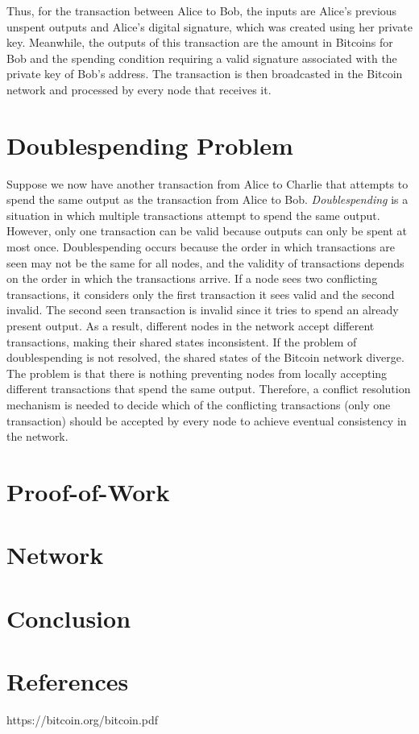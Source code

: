 \documentclass{article}
\begin{document}
Thus, for the transaction between Alice to Bob, the inputs are Alice's previous unspent outputs and Alice's digital signature, which was created using her private key. Meanwhile, the outputs of this transaction are the amount in Bitcoins for Bob and the spending condition requiring a valid signature associated with the private key of Bob's address. The transaction is then broadcasted in the Bitcoin network and processed by every node that receives it. 

\section{Doublespending Problem}

Suppose we now have another transaction from Alice to Charlie that attempts to spend the same output as the transaction from Alice to Bob. \emph{Doublespending} is a situation in which multiple transactions attempt to spend the same output. However, only one transaction can be valid because outputs can only be spent at most once. Doublespending occurs because the order in which transactions are seen may not be the same for all nodes, and the validity of transactions depends on the order in which the transactions arrive. If a node sees two conflicting transactions, it considers only the first transaction it sees valid and the second invalid. The second seen transaction is invalid since it tries to spend an already present output. As a result, different nodes in the network accept different transactions, making their shared states inconsistent. If the problem of doublespending is not resolved, the shared states of the Bitcoin network diverge. The problem is that there is nothing preventing nodes from locally accepting different transactions that spend the same output. Therefore, a conflict resolution mechanism is needed to decide which of the conflicting transactions (only one transaction) should be accepted by every node to achieve eventual consistency in the network.

\section{Proof-of-Work}

\section{Network}

\section{Conclusion}

\section{References}
https://bitcoin.org/bitcoin.pdf 
\end{document}
